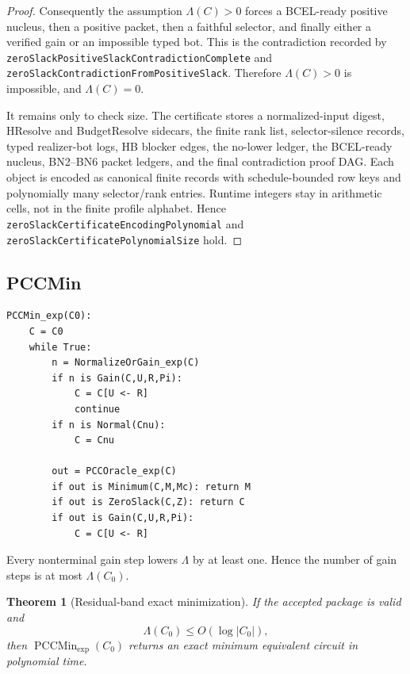 \documentclass[10.5pt,a4paper]{article}
\newtheorem{theorem}{Theorem}[section]
\newcommand{\PCCMin}{\operatorname{PCCMin}_{\exp}}
\begin{document}
\begin{proof}
Consequently the assumption \(\Lambda(C)>0\) forces a BCEL-ready positive nucleus, then a positive packet, then a faithful selector, and finally either a verified gain or an impossible typed bot.  This is the contradiction recorded by \texttt{zeroSlackPositiveSlackContradictionComplete} and \texttt{zeroSlackContradictionFromPositiveSlack}.  Therefore \(\Lambda(C)>0\) is impossible, and \(\Lambda(C)=0\).

It remains only to check size.  The certificate stores a normalized-input digest, HResolve and BudgetResolve sidecars, the finite rank list, selector-silence records, typed realizer-bot logs, HB blocker edges, the no-lower ledger, the BCEL-ready nucleus, BN2--BN6 packet ledgers, and the final contradiction proof DAG.  Each object is encoded as canonical finite records with schedule-bounded row keys and polynomially many selector/rank entries.  Runtime integers stay in arithmetic cells, not in the finite profile alphabet.  Hence \texttt{zeroSlackCertificateEncodingPolynomial} and \texttt{zeroSlackCertificatePolynomialSize} hold.
\end{proof}

\subsection{PCCMin}
\begin{lstlisting}
PCCMin_exp(C0):
    C = C0
    while True:
        n = NormalizeOrGain_exp(C)
        if n is Gain(C,U,R,Pi):
            C = C[U <- R]
            continue
        if n is Normal(Cnu):
            C = Cnu

        out = PCCOracle_exp(C)
        if out is Minimum(C,M,Mc): return M
        if out is ZeroSlack(C,Z): return C
        if out is Gain(C,U,R,Pi):
            C = C[U <- R]
\end{lstlisting}

Every nonterminal gain step lowers \(\Lambda\) by at least one. Hence the number of gain steps is at most \(\Lambda(C_0)\).

\begin{theorem}[Residual-band exact minimization]
If the accepted package is valid and
\[
\Lambda(C_0)\le O(\log |C_0|),
\]
then \(\PCCMin(C_0)\) returns an exact minimum equivalent circuit in polynomial time.
\end{theorem}
\end{document}
